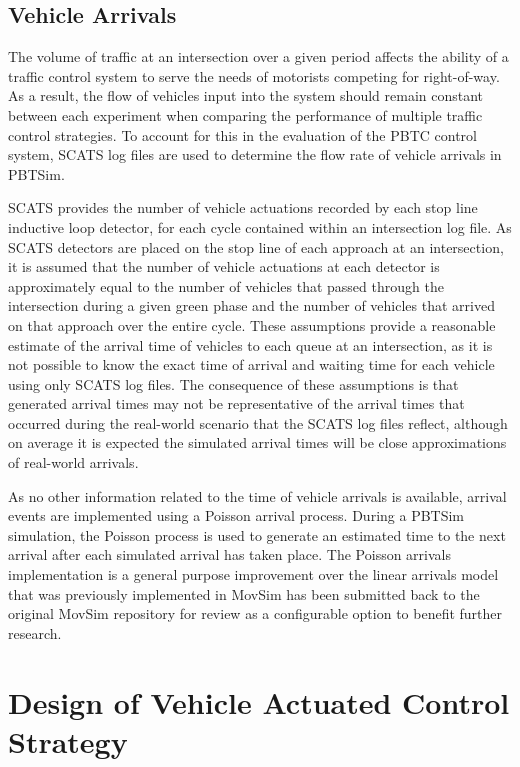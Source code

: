 \subsection{Vehicle Arrivals}

The volume of traffic at an intersection over a given period affects the ability of a traffic control system to serve the needs of motorists competing for right-of-way. As a result, the flow of vehicles input into the system should remain constant between each experiment when comparing the performance of multiple traffic control strategies. To account for this in the evaluation of the PBTC control system, SCATS log files are used to determine the flow rate of vehicle arrivals in PBTSim. 

SCATS provides the number of vehicle actuations recorded by each stop line inductive loop detector, for each cycle contained within an intersection log file. As SCATS detectors are placed on the stop line of each approach at an intersection, it is assumed that the number of vehicle actuations at each detector is approximately equal to the number of vehicles that passed through the intersection during a given green phase and the number of vehicles that arrived on that approach over the entire cycle. These assumptions provide a reasonable estimate of the arrival time of vehicles to each queue at an intersection, as it is not possible to know the exact time of arrival and waiting time for each vehicle using only SCATS log files. The consequence of these assumptions is that generated arrival times may not be representative of the arrival times that occurred during the real-world scenario that the SCATS log files reflect, although on average it is expected the simulated arrival times will be close approximations of real-world arrivals. 

As no other information related to the time of vehicle arrivals is available, arrival events are implemented using a Poisson arrival process. During a PBTSim simulation, the Poisson process is used to generate an estimated time to the next arrival after each simulated arrival has taken place. The Poisson arrivals implementation is a general purpose improvement over the linear arrivals model that was previously implemented in MovSim has been submitted back to the original MovSim repository for review as a configurable option to benefit further research.

\section{Design of Vehicle Actuated Control Strategy}

